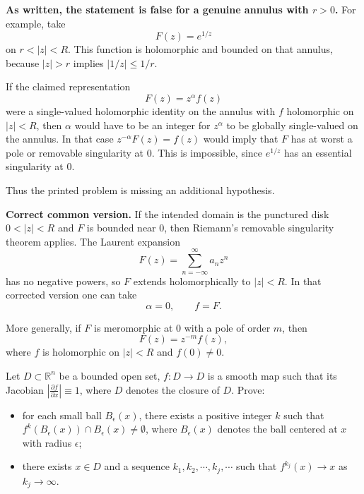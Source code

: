 \begin{solution}
\textbf{As written, the statement is false for a genuine annulus with $r>0$.}
For example, take
\[
F(z)=e^{1/z}
\]
on $r<|z|<R$. This function is holomorphic and bounded on that annulus, because $|z|>r$ implies $|1/z|\leq 1/r$.

If the claimed representation
\[
F(z)=z^\alpha f(z)
\]
were a single-valued holomorphic identity on the annulus with $f$ holomorphic on $|z|<R$, then $\alpha$ would have to be an integer for $z^\alpha$ to be globally single-valued on the annulus. In that case $z^{-\alpha}F(z)=f(z)$ would imply that $F$ has at worst a pole or removable singularity at $0$. This is impossible, since $e^{1/z}$ has an essential singularity at $0$.

Thus the printed problem is missing an additional hypothesis.

\textbf{Correct common version.}
If the intended domain is the punctured disk $0<|z|<R$ and $F$ is bounded near $0$, then Riemann's removable singularity theorem applies. The Laurent expansion
\[
F(z)=\sum_{n=-\infty}^{\infty}a_nz^n
\]
has no negative powers, so $F$ extends holomorphically to $|z|<R$. In that corrected version one can take
\[
\alpha=0,\qquad f=F.
\]

More generally, if $F$ is meromorphic at $0$ with a pole of order $m$, then
\[
F(z)=z^{-m}f(z),
\]
where $f$ is holomorphic on $|z|<R$ and $f(0)\neq0$.
\end{solution}

\begin{exercise}
\label{analysis:2014:10}
Let $D\subset\mathbb{R}^n$ be a bounded open set, $f:D\to D$ is a smooth map such that its Jacobian $\left|\frac{\partial f}{\partial x}\right|\equiv 1$, where $D$ denotes the closure of $D$. Prove:

\begin{itemize}
\item[a)] for each small ball $B_{\epsilon}(x)$, there exists a positive integer $k$ such that $f^k(B_{\epsilon}(x))\cap B_{\epsilon}(x)\neq\emptyset$, where $B_{\epsilon}(x)$ denotes the ball centered at $x$ with radius $\epsilon$;
\item[b)] there exists $x\in D$ and a sequence $k_1,k_2,\cdots,k_j,\cdots$ such that $f^{k_j}(x)\to x$ as $k_j\to\infty$.
\end{itemize}
\end{exercise}

